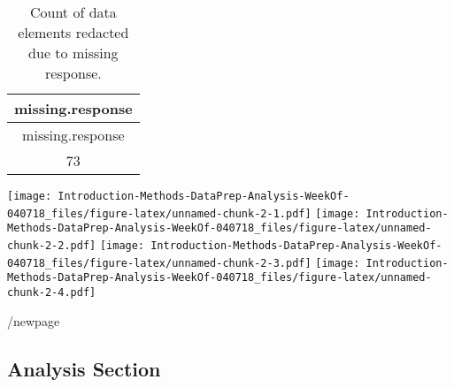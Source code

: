 \documentclass[12pt,]{article}
\newenvironment{Shaded}{\begin{snugshade}}{\end{snugshade}}
\newcommand{\KeywordTok}[1]{\textcolor[rgb]{0.13,0.29,0.53}{\textbf{#1}}}
\newcommand{\DataTypeTok}[1]{\textcolor[rgb]{0.13,0.29,0.53}{#1}}
\newcommand{\DecValTok}[1]{\textcolor[rgb]{0.00,0.00,0.81}{#1}}
\newcommand{\StringTok}[1]{\textcolor[rgb]{0.31,0.60,0.02}{#1}}
\newcommand{\OtherTok}[1]{\textcolor[rgb]{0.56,0.35,0.01}{#1}}
\newcommand{\ControlFlowTok}[1]{\textcolor[rgb]{0.13,0.29,0.53}{\textbf{#1}}}
\newcommand{\OperatorTok}[1]{\textcolor[rgb]{0.81,0.36,0.00}{\textbf{#1}}}
\newcommand{\NormalTok}[1]{#1}
\begin{document}
\begin{Shaded}
\end{Shaded}

\newpage

\begin{longtable}[]{@{}c@{}}
\caption{Count of data elements redacted due to missing
response.}\tabularnewline
\toprule
\begin{minipage}[b]{0.24\columnwidth}\centering\strut
missing.response\strut
\end{minipage}\tabularnewline
\midrule
\endfirsthead
\toprule
\begin{minipage}[b]{0.24\columnwidth}\centering\strut
missing.response\strut
\end{minipage}\tabularnewline
\midrule
\endhead
\begin{minipage}[t]{0.24\columnwidth}\centering\strut
73\strut
\end{minipage}\tabularnewline
\bottomrule
\end{longtable}

\texttt{[image: Introduction-Methods-DataPrep-Analysis-WeekOf-040718\_files/figure-latex/unnamed-chunk-2-1.pdf]}
\texttt{[image: Introduction-Methods-DataPrep-Analysis-WeekOf-040718\_files/figure-latex/unnamed-chunk-2-2.pdf]}
\texttt{[image: Introduction-Methods-DataPrep-Analysis-WeekOf-040718\_files/figure-latex/unnamed-chunk-2-3.pdf]}
\texttt{[image: Introduction-Methods-DataPrep-Analysis-WeekOf-040718\_files/figure-latex/unnamed-chunk-2-4.pdf]}

/newpage

\subsection{Analysis Section}\label{analysis-section}
\end{document}
